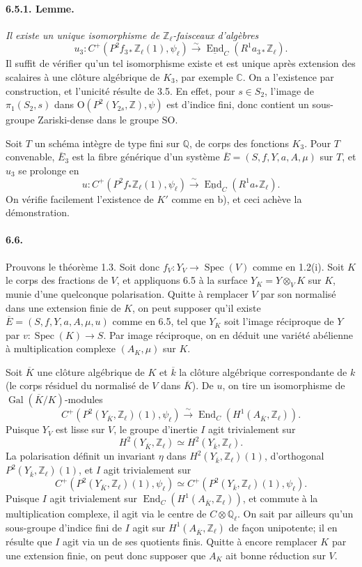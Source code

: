 \documentclass[10pt,leqno]{article}
\newcommand{\C}{\mathbb{C}}
\newcommand{\Q}{\mathbb{Q}}
\newcommand{\Z}{\mathbb{Z}}
\newcommand{\Gal}{\operatorname{Gal}}
\newcommand{\Spec}{\operatorname{Spec}}
\newcommand{\End}{\operatorname{End}}
\newcommand{\iso}{\xrightarrow{\sim}}
\begin{document}
\clearpage

\paragraph{6.5.1. Lemme.} \emph{Il existe un unique isomorphisme de $\Z_\ell$-faisceaux d'algèbres}
\[
u_3:C^+(P^2f_{3*}\Z_\ell(1),\psi_\ell)\iso
\underline{\End}_C(R^1a_{3*}\Z_\ell).
\]
Il suffit de vérifier qu'un tel isomorphisme existe et est unique après extension des scalaires à une clôture algébrique de $K_3$, par exemple $\C$. On a l'existence par construction, et l'unicité résulte de 3.5. En effet, pour $s\in S_2$, l'image de $\pi_1(S_2,s)$ dans $\mathrm O(P^2(Y_{2s},\Z),\psi)$ est d'indice fini, donc contient un sous-groupe Zariski-dense dans le groupe $\mathrm{SO}$.

Soit $T$ un schéma intègre de type fini sur $\Q$, de corps des fonctions $K_3$. Pour $T$ convenable, $\overline E_3$ est la fibre générique d'un système $\overline E=(S,f,Y,a,A,\mu)$ sur $T$, et $u_3$ se prolonge en
\[
u:C^+(P^2f_*\Z_\ell(1),\psi_\ell)\iso
\underline{\End}_C(R^1a_*\Z_\ell).
\]
On vérifie facilement l'existence de $K'$ comme en b), et ceci achève la démonstration.

\paragraph{6.6.} Prouvons le théorème 1.3. Soit donc $f_V:Y_V\to\Spec(V)$ comme en 1.2(i). Soit $K$ le corps des fractions de $V$, et appliquons 6.5 à la surface $Y_K=Y\otimes_V K$ sur $K$, munie d'une quelconque polarisation. Quitte à remplacer $V$ par son normalisé dans une extension finie de $K$, on peut supposer qu'il existe $\overline E=(S,f,Y,a,A,\mu,u)$ comme en 6.5, tel que $Y_K$ soit l'image réciproque de $Y$ par $v:\Spec(K)\to S$. Par image réciproque, on en déduit une variété abélienne à multiplication complexe $(A_K,\mu)$ sur $K$.

Soit $\overline K$ une clôture algébrique de $K$ et $\overline k$ la clôture algébrique correspondante de $k$ (le corps résiduel du normalisé de $V$ dans $\overline K$). De $u$, on tire un isomorphisme de $\Gal(\overline K/K)$-modules
\[
\tag{6.6.1}
C^+(P^2(Y_{\overline K},\Z_\ell)(1),\psi_\ell)\iso
\End_C(H^1(A_{\overline K},\Z_\ell)).
\]
Puisque $Y_V$ est lisse sur $V$, le groupe d'inertie $I$ agit trivialement sur
\[
H^2(Y_{\overline K},\Z_\ell)\simeq H^2(Y_{\overline k},\Z_\ell).
\]
La polarisation définit un invariant $\eta$ dans $H^2(Y_{\overline k},\Z_\ell)(1)$, d'orthogonal $P^2(Y_{\overline k},\Z_\ell)(1)$, et $I$ agit trivialement sur
\[
C^+(P^2(Y_{\overline K},\Z_\ell)(1),\psi_\ell)\simeq
C^+(P^2(Y_{\overline k},\Z_\ell)(1),\psi_\ell).
\]
Puisque $I$ agit trivialement sur $\End_C(H^1(A_{\overline K},\Z_\ell))$, et commute à la multiplication complexe, il agit via le centre de $C\otimes\Q_\ell$. On sait par ailleurs qu'un sous-groupe d'indice fini de $I$ agit sur $H^1(A_{\overline K},\Z_\ell)$ de façon unipotente; il en résulte que $I$ agit via un de ses quotients finis. Quitte à encore remplacer $K$ par une extension finie, on peut donc supposer que $A_K$ ait bonne réduction sur $V$.
\end{document}
